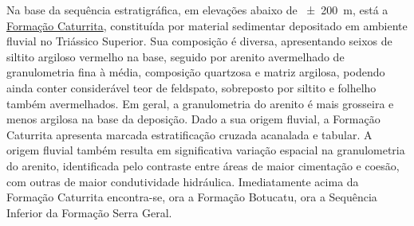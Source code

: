 
Na base da sequência estratigráfica, em elevações abaixo de \SI{\pm200}{\metre}, está a 
\href{http://pt.wikipedia.org/wiki/Forma\%C3\%A7\%C3\%A3o_Caturrita}{Formação Caturrita}, 
constituída por material sedimentar depositado em ambiente fluvial no Triássico Superior. Sua 
composição é diversa, apresentando seixos de siltito argiloso vermelho na base, seguido por arenito 
avermelhado de granulometria fina à média, composição quartzosa e matriz argilosa, podendo ainda 
conter considerável teor de feldspato, sobreposto por siltito e folhelho também avermelhados. Em 
geral, a granulometria do arenito é mais grosseira e menos argilosa na base da deposição. Dado a sua
origem fluvial, a Formação Caturrita apresenta marcada estratificação cruzada acanalada e tabular. 
A origem fluvial também resulta em significativa variação espacial na granulometria do arenito, 
identificada pelo contraste entre áreas de maior cimentação e coesão, com outras de maior 
condutividade hidráulica. Imediatamente acima da Formação Caturrita encontra-se, ora a Formação 
Botucatu, ora a Sequência Inferior da Formação Serra Geral.


